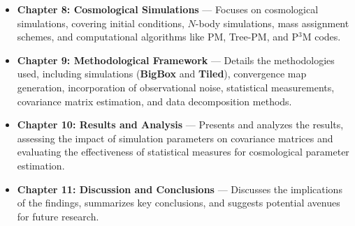 \begin{itemize}
    \item \textbf{Chapter 8: Cosmological Simulations} --- Focuses on cosmological simulations, covering initial conditions, $N$-body simulations, mass assignment schemes, and computational algorithms like PM, Tree-PM, and P$^3$M codes.
    
    \item \textbf{Chapter 9: Methodological Framework} --- Details the methodologies used, including simulations (\textbf{BigBox} and \textbf{Tiled}), convergence map generation, incorporation of observational noise, statistical measurements, covariance matrix estimation, and data decomposition methods.
    
    \item \textbf{Chapter 10: Results and Analysis} --- Presents and analyzes the results, assessing the impact of simulation parameters on covariance matrices and evaluating the effectiveness of statistical measures for cosmological parameter estimation.
    
    \item \textbf{Chapter 11: Discussion and Conclusions} --- Discusses the implications of the findings, summarizes key conclusions, and suggests potential avenues for future research.
\end{itemize}